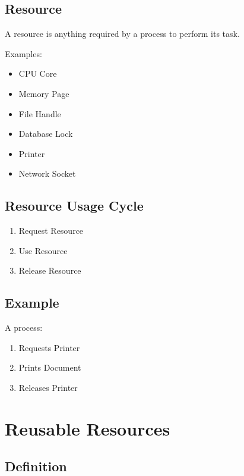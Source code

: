 \subsection{Resource}

A resource is anything required by a process to perform its task.

Examples:

\begin{itemize}
\item CPU Core
\item Memory Page
\item File Handle
\item Database Lock
\item Printer
\item Network Socket
\end{itemize}

\subsection{Resource Usage Cycle}

\begin{enumerate}
\item Request Resource
\item Use Resource
\item Release Resource
\end{enumerate}

\subsection{Example}

A process:

\begin{enumerate}
\item Requests Printer
\item Prints Document
\item Releases Printer
\end{enumerate}

\section{Reusable Resources}

\subsection{Definition}

